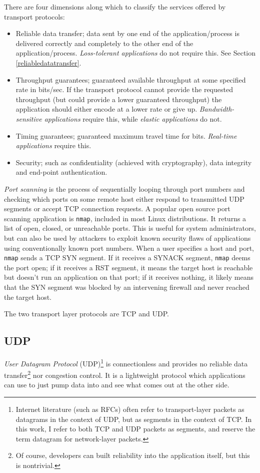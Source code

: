 \documentclass[8pt, table, xcdraw]{article}%
\begin{document}
There are four dimensions along which to classify the services offered by transport protocols:

\begin{itemize}
    \item Reliable data transfer; data sent by one end of the application/process is delivered correctly and completely to the other end of the application/process. \emph{Loss-tolerant applications} do not require this. See Section \ref{reliabledatatransfer}.
    \item Throughput guarantees; guaranteed available throughput at some specified rate in bits/sec. If the transport protocol cannot provide the requested throughput (but could provide a lower guaranteed throughput) the application should either encode at a lower rate or give up. \emph{Bandwidth-sensitive applications} require this, while \emph{elastic applications} do not.
    \item Timing guarantees; guaranteed maximum travel time for bits. \emph{Real-time applications} require this.
    \item Security; such as confidentiality (achieved with cryptography), data integrity and end-point authentication.
\end{itemize}

\emph{Port scanning} is the process of sequentially looping through port numbers and checking which ports on some remote host either respond to transmitted UDP segments or accept TCP connection requests. A popular open source port scanning application is \texttt{nmap}, included in most Linux distributions. It returns a list of open, closed, or unreachable ports. This is useful for system administrators, but can also be used by attackers to exploit known security flaws of applications using conventionally known port numbers. When a user specifies a host and port, \texttt{nmap} sends a TCP SYN segment. If it receives a SYNACK segment, \texttt{nmap} deems the port open; if it receives a RST segment, it means the target host is reachable but doesn't run an application on that port; if it receives nothing, it likely means that the SYN segment was blocked by an intervening firewall and never reached the target host.
 
The two transport layer protocols are TCP and UDP.

\subsection{UDP}

\emph{User Datagram Protocol} (UDP)\footnote{Internet literature (such as RFCs) often refer to transport-layer packets as datagrams in the context of UDP, but as segments in the context of TCP. In this work, I refer to both TCP and UDP packets as segments, and reserve the term datagram for network-layer packets.} is connectionless and provides no reliable data transfer\footnote{Of course, developers can built reliability into the application itself, but this is nontrivial.} nor congestion control. It is a lightweight protocol which applications can use to just pump data into and see what comes out at the other side.
\end{document}
